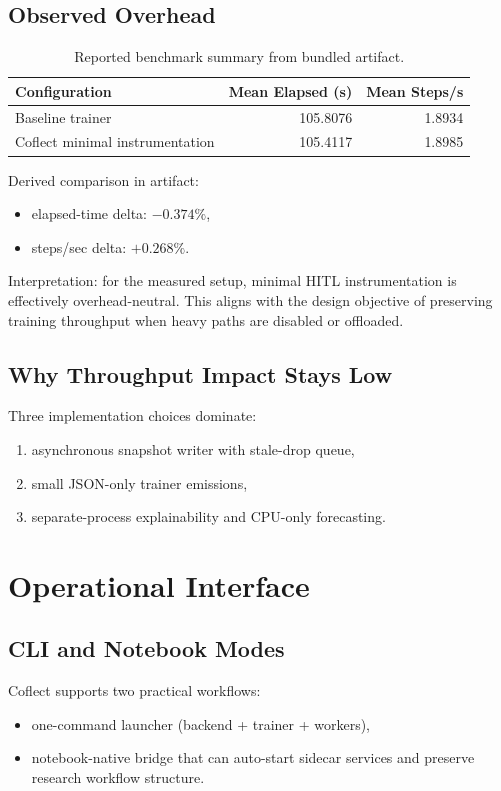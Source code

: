 \documentclass[11pt]{article}
\begin{document}
\subsection{Observed Overhead}
\begin{table}[h]
\centering
\small
\begin{tabular}{lrr}
\toprule
Configuration & Mean Elapsed (s) & Mean Steps/s \\
\midrule
Baseline trainer & 105.8076 & 1.8934 \\
Coflect minimal instrumentation & 105.4117 & 1.8985 \\
\bottomrule
\end{tabular}
\caption{Reported benchmark summary from bundled artifact.}
\label{tab:overhead}
\end{table}

Derived comparison in artifact:
\begin{itemize}[leftmargin=1.5em]
  \item elapsed-time delta: \(-0.374\%\),
  \item steps/sec delta: \(+0.268\%\).
\end{itemize}

Interpretation: for the measured setup, minimal HITL instrumentation is effectively overhead-neutral.
This aligns with the design objective of preserving training throughput when heavy paths are disabled or offloaded.

\subsection{Why Throughput Impact Stays Low}
Three implementation choices dominate:
\begin{enumerate}[leftmargin=1.5em]
  \item asynchronous snapshot writer with stale-drop queue,
  \item small JSON-only trainer emissions,
  \item separate-process explainability and CPU-only forecasting.
\end{enumerate}

\section{Operational Interface}
\subsection{CLI and Notebook Modes}
Coflect supports two practical workflows:
\begin{itemize}[leftmargin=1.5em]
  \item one-command launcher (backend + trainer + workers),
  \item notebook-native bridge that can auto-start sidecar services and preserve research workflow structure.
\end{itemize}
\end{document}
